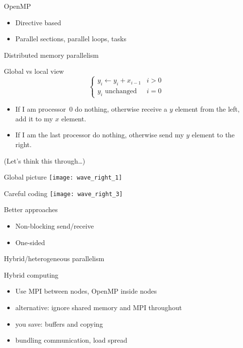 \begin{numberedframe}{OpenMP}
  \begin{itemize}
  \item Directive based
  \item Parallel sections, parallel loops, tasks
  \end{itemize}
\end{numberedframe}

 {Distributed memory parallelism}

\begin{numberedframe}{Global vs local view}
  \[ 
\begin{cases}
y_i\leftarrow y_i+x_{i-1}&i>0\\ \mbox{$y_i$ unchanged}&i=0
\end{cases}
\]
\begin{itemize}
\item If I am processor~0 do nothing, otherwise receive a $y$ element
  from the left, add it to my $x$ element.
\item If I am the last processor do nothing, otherwise send my $y$
  element to the right.
\end{itemize}
(Let's think this through\ldots)
\end{numberedframe}

\begin{numberedframe}{Global picture}
  \texttt{[image: wave\_right\_1]}  
\end{numberedframe}

\begin{numberedframe}{Careful coding}
  \texttt{[image: wave\_right\_3]}  
\end{numberedframe}

\begin{numberedframe}{Better approaches}
  \begin{itemize}
  \item Non-blocking send/receive
  \item One-sided
  \end{itemize}
\end{numberedframe}

 {Hybrid/heterogeneous parallelism}

\begin{numberedframe}{Hybrid computing}
  \begin{itemize}
  \item Use MPI between nodes, OpenMP inside nodes
  \item alternative: ignore shared memory and MPI throughout
  \item you save: buffers and copying
  \item bundling communication, load spread 
  \end{itemize}
\end{numberedframe}

